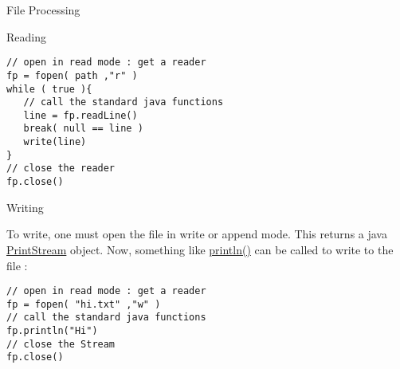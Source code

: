 \begin{section}{File Processing}
\begin{subsection}{Reading}
\begin{lstlisting}[style=JexlStyle]
// open in read mode : get a reader
fp = fopen( path ,"r" )
while ( true ){
   // call the standard java functions
   line = fp.readLine()
   break( null == line )
   write(line)
}
// close the reader
fp.close()
\end{lstlisting}

\end{subsection}

\begin{subsection}{Writing}

To write, one must open the file in write or append mode.
This returns a java \href{https://docs.oracle.com/javase/8/docs/api/java/io/PrintStream.html}{PrintStream} object.
Now, something like \href{https://docs.oracle.com/javase/8/docs/api/java/io/PrintStream.html#println-java.lang.Object-}{println()}
can be called to write to the file :

\begin{lstlisting}[style=JexlStyle]
// open in read mode : get a reader
fp = fopen( "hi.txt" ,"w" )
// call the standard java functions
fp.println("Hi")
// close the Stream
fp.close()
\end{lstlisting}

\end{subsection}

\end{section}

